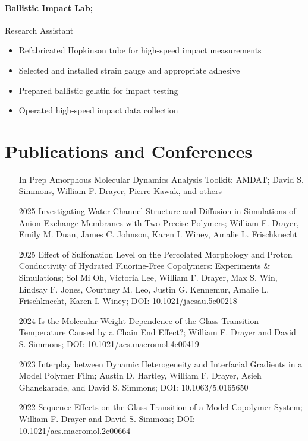 \documentclass{my_cv}
\begin{document}
\paragraph{Ballistic Impact Lab;}
Research Assistant
\begin{itemize}
    \item Re\-fabricated Hopkins\-on tube for high-speed impact measurements
    \item Selected and installed strain gauge and appropriate adhesive
    \item Prepared ballistic gelatin for impact testing
    \item Operated high-speed impact data collection
\end{itemize}

\section{Publications and Conferences}
\begin{itemize}
    \item[In Prep] Amorphous Molecular Dynamics Analysis Toolkit: AMDAT; 
    David S. Simmons, William F. Drayer, Pierre Kawak, and others
    \item[2025] Investigating Water Channel Structure and Diffusion in Simulations of Anion Exchange Membranes with Two Precise Polymers; 
    William F. Drayer, Emily M. Duan, James C. Johnson, Karen I. Winey, Amalie L. Frischknecht
    \item[2025] Effect of Sulfonation Level on the Percolated Morphology and Proton Conductivity of Hydrated Fluorine-Free Copolymers: 
    Experiments \& Simulations; 
    Sol Mi Oh, Victoria Lee, William F. Drayer, Max S. Win, Lindsay F. Jones, Courtney M. Leo, Justin G. Kennemur, Amalie L. Frischknecht, Karen I. Winey;
    DOI: 10.1021/jacsau.5c00218
    \item[2024] Is the Molecular Weight Dependence of the Glass Transition Temperature Caused by a Chain End Effect?;
    William F. Drayer and David S. Simmons; DOI: 10.1021/acs.macromol.4c00419
    \item[2023] Interplay between Dynamic Heterogeneity and Inter\-facial Gradients in a Model Polymer Film; 
    Austin D. Hartley, William F. Drayer, Asieh Ghanekarade, and David S. Simmons; DOI: 10.1063/5.0165650
    \item[2022] Sequence Effects on the Glass Transition of a Model Co\-polymer System; 
    William F. Drayer and David S. Simmons; 
    DOI: 10.1021/acs.macromol.2c00664
\end{itemize}
\end{document}

